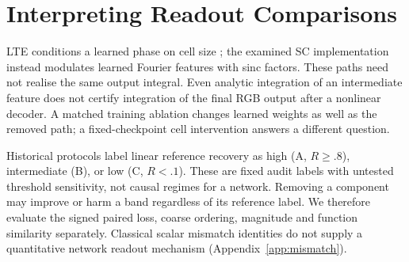 \section{Interpreting Readout Comparisons}\label{sec:zones}
LTE conditions a learned phase on cell size \citep{lee2022lte}; the
examined SC implementation instead modulates learned Fourier features
with sinc factors. These paths need not realise the same output integral.
Even analytic integration of an intermediate feature does not certify
integration of the final RGB output after a nonlinear decoder. A matched
training ablation changes learned weights as well as the removed path;
a fixed-checkpoint cell intervention answers a different question.

Historical protocols label linear reference recovery as high (A,
$R\ge.8$), intermediate (B), or low (C, $R<.1$). These are fixed audit
labels with untested threshold sensitivity, not causal regimes for a
network. Removing a component may improve or harm a band regardless of
its reference label. We therefore evaluate the signed paired loss,
coarse ordering, magnitude and function similarity separately.
Classical scalar mismatch identities do not supply a quantitative
network readout mechanism (Appendix~\ref{app:mismatch}).
